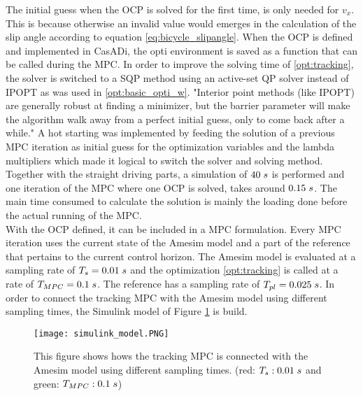 The initial guess when the OCP is solved for the first time, is only needed for $v_x$. This is because otherwise an invalid value would emerges in the calculation of the slip angle according to equation \ref{eq:bicycle_slipangle}. When the OCP is defined and implemented in CasADi, the opti environment is saved as a function that can be called during the MPC. In order to improve the solving time of \ref{opt:tracking}, the solver is switched to a SQP method using an active-set QP solver instead of IPOPT as was used in \ref{opt:basic_opti_w}. "Interior point methods (like IPOPT) are generally robust at finding a minimizer, but the barrier parameter will make the algorithm walk away from a perfect initial guess, only to come back after a while." \cite{Gillis2019} A hot starting was implemented by feeding the solution of a previous MPC iteration as initial guess for the optimization variables and the lambda multipliers which made it logical to switch the solver and solving method. Together with the straight driving parts, a simulation of $40\hspace{1mm}s$ is performed and one iteration of the MPC where one OCP is solved, takes around $0.15\hspace{1mm}s$. The main time consumed to calculate the solution is mainly the loading done before the actual running of the MPC.\\

With the OCP defined, it can be included in a MPC formulation. Every MPC iteration uses the current state of the Amesim model and a part of the reference that pertains to the current control horizon. The Amesim model is evaluated at a sampling rate of $T_s = 0.01 \hspace{1mm}s$ and the optimization \ref{opt:tracking} is called at a rate of $T_{MPC} = 0.1 \hspace{1mm}s$. The reference has a sampling rate of $T_{pl} = 0.025\hspace{1mm}s$. In order to connect the tracking MPC with the Amesim model using different sampling times, the Simulink model of Figure \ref{fig:simulink_model} is build. \\

\begin{figure}[h!]
	\centering
	\texttt{[image: simulink\_model.PNG]}
	\caption{This figure shows hows the tracking MPC is connected with the Amesim model using different sampling times. (red: $T_s: 0.01\hspace{1mm}s$ and green: $T_{MPC}:0.1\hspace{1mm}s$)}	
	\label{fig:simulink_model}
\end{figure}

